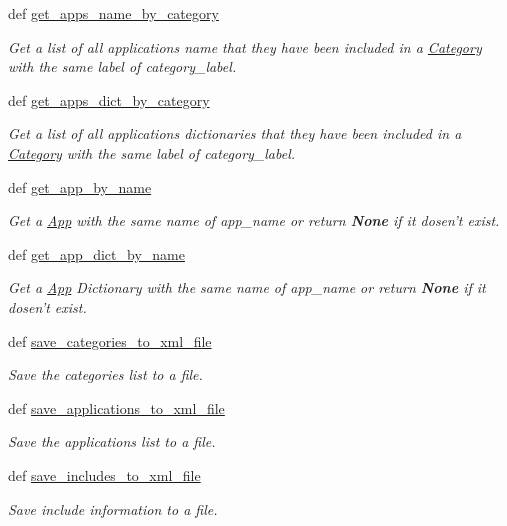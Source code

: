 \begin{CompactItemize}
def \hyperlink{classwinsollib_1_1Image_0de62253fdbd1ce1a517ad02bf189b49}{get\_\-apps\_\-name\_\-by\_\-category}
\begin{CompactList}\small\item\em Get a list of all applications name that they have been included in a \hyperlink{classwinsollib_1_1Category}{Category} with the same label of {\em category\_\-label\/}. \item\end{CompactList}\item 
def \hyperlink{classwinsollib_1_1Image_1b2feb52e44154e0585bba1c1c3691be}{get\_\-apps\_\-dict\_\-by\_\-category}
\begin{CompactList}\small\item\em Get a list of all applications dictionaries that they have been included in a \hyperlink{classwinsollib_1_1Category}{Category} with the same label of {\em category\_\-label\/}. \item\end{CompactList}\item 
def \hyperlink{classwinsollib_1_1Image_6145721e18889e1c360e1a8578adb3b0}{get\_\-app\_\-by\_\-name}
\begin{CompactList}\small\item\em Get a \hyperlink{classwinsollib_1_1App}{App} with the same name of {\em app\_\-name\/} or return {\bf None} if it dosen't exist. \item\end{CompactList}\item 
def \hyperlink{classwinsollib_1_1Image_0a4c64e2001437a1312650788196a4e1}{get\_\-app\_\-dict\_\-by\_\-name}
\begin{CompactList}\small\item\em Get a \hyperlink{classwinsollib_1_1App}{App} Dictionary with the same name of {\em app\_\-name\/} or return {\bf None} if it dosen't exist. \item\end{CompactList}\item 
def \hyperlink{classwinsollib_1_1Image_0b75dfc2d45b94ad98990005093aeccf}{save\_\-categories\_\-to\_\-xml\_\-file}
\begin{CompactList}\small\item\em Save the categories list to a file. \item\end{CompactList}\item 
def \hyperlink{classwinsollib_1_1Image_34fc12f8ac22e909bff7263b0ca020c8}{save\_\-applications\_\-to\_\-xml\_\-file}
\begin{CompactList}\small\item\em Save the applications list to a file. \item\end{CompactList}\item 
def \hyperlink{classwinsollib_1_1Image_2d5c8e0ad2d904634ecb3688576ef25d}{save\_\-includes\_\-to\_\-xml\_\-file}
\begin{CompactList}\small\item\em Save include information to a file. \item\end{CompactList}\end{CompactItemize}
